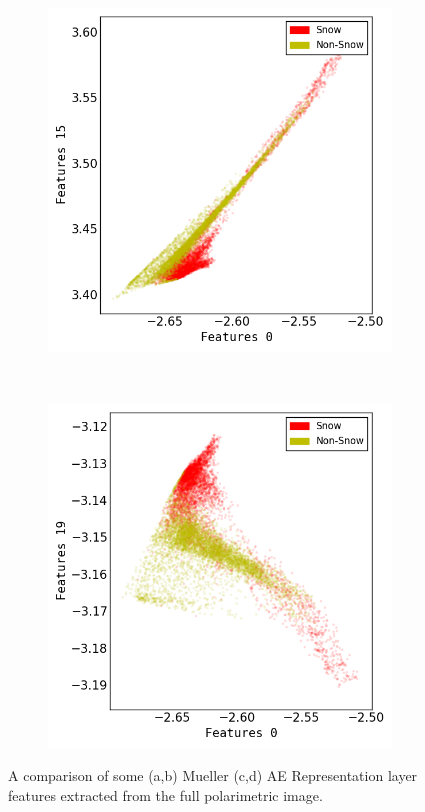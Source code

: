 \begin{figure}
\begin{subfigure}[b]{0.45\textwidth}
\caption{}
\end{subfigure}
~
\centering
\begin{subfigure}[b]{0.45\textwidth}
\includegraphics[width=\textwidth]{Figures/SnowCover2018/AE/0_15}
\caption{}
\end{subfigure}
~
\begin{subfigure}[b]{0.45\textwidth}
\includegraphics[width=\textwidth]{Figures/SnowCover2018/AE/0_19}
\caption{}
\end{subfigure}
\caption{A comparison of some (a,b) Mueller (c,d) AE Representation layer features extracted from the full polarimetric image. }
\label{fig:AE_M_comp}
\end{figure}




